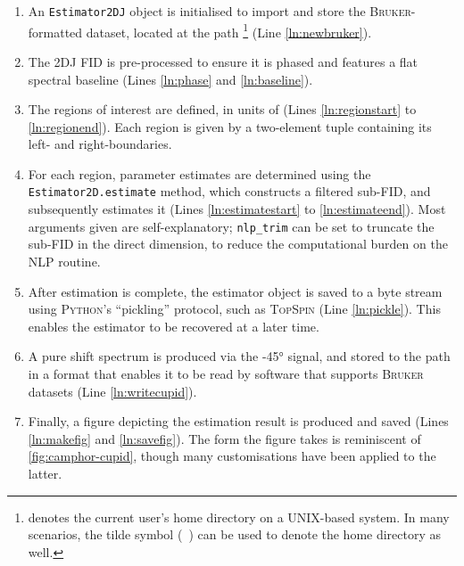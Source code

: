 \begin{enumerate}
    \item An \texttt{Estimator2DJ} object is initialised to import and store
        the \textsc{Bruker}-formatted dataset, located at the path
        \footnote{
             denotes the current user's home directory on a
            UNIX-based system. In many scenarios, the tilde symbol
            (\texttt{~})
            can be used to denote the home directory as well.
        }
        (Line \ref{ln:newbruker}).
    \item The \ac{2DJ} \ac{FID} is pre-processed to ensure it is phased and
        features a flat spectral baseline (Lines \ref{ln:phase} and
        \ref{ln:baseline}).
    \item The regions of interest are defined, in units of
        \unit{\partspermillion} (Lines \ref{ln:regionstart} to
        \ref{ln:regionend}). Each region is given by a two-element tuple
        containing its left- and right-boundaries.
    \item For each region, parameter estimates are determined using the
        \texttt{Estimator2D.estimate} method, which constructs a filtered
        sub-\ac{FID}, and subsequently estimates it (Lines
        \ref{ln:estimatestart} to \ref{ln:estimateend}). Most arguments given
        are self-explanatory; \texttt{nlp_trim} can be set to
        truncate the sub-\ac{FID} in the direct dimension, to reduce the
        computational burden on the \ac{NLP} routine.
    \item After estimation is complete, the estimator object is saved to a byte
        stream using \textsc{Python}'s ``pickling'' protocol\cite{pickle}, such
        as \textsc{TopSpin} (Line \ref{ln:pickle}).
        This enables the estimator to be recovered at a later time.
    \item A pure shift spectrum is produced via the \ang{-45} signal, and
        stored to the path  in a format that enables
        it to be read by software that supports \textsc{Bruker} datasets (Line
        \ref{ln:writecupid}).
    \item Finally, a figure depicting the estimation result is produced and
        saved (Lines \ref{ln:makefig} and \ref{ln:savefig}). The form the
        figure takes is reminiscent of \cref{fig:camphor-cupid}, though many
        customisations have been applied to the latter.
\end{enumerate}
